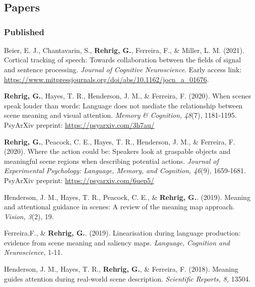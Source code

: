 \section*{}
\label{sec:pubs}

\subsection*{Papers}

\subsubsection*{Published}

Beier, E. J., Chantavarin, S., \textbf{Rehrig, G.}, Ferreira, F., \& Miller, L. M. (2021). Cortical tracking of speech: Towards collaboration between the fields of signal and sentence processing. \textit{Journal of Cognitive Neuroscience}. Early access link: \url{https://www.mitpressjournals.org/doi/abs/10.1162/jocn_a_01676}.

\textbf{Rehrig, G.}, Hayes, T. R., Henderson, J. M., \& Ferreira, F. (2020). When scenes speak louder than words: Language does not mediate the relationship between scene meaning and visual attention. \textit{Memory \& Cognition, 48}(7), 1181-1195. PsyArXiv preprint: \url{https://psyarxiv.com/3h7au/}

\textbf{Rehrig, G.}, Peacock, C. E., Hayes, T. R., Henderson, J. M., \& Ferreira, F. (2020). Where the action could be: Speakers look at graspable objects and meaningful scene regions when describing potential actions. \textit{Journal of Experimental Psychology: Language, Memory, and Cognition, 46}(9), 1659-1681. PsyArXiv preprint: \url{https://psyarxiv.com/6uep5/}

Henderson, J. M., Hayes, T. R., Peacock, C. E., \& \textbf{Rehrig, G.}. (2019). Meaning and attentional guidance in scenes: A review of the meaning map approach. \textit{Vision, 3}(2), 19.


Ferreira,F., \& \textbf{Rehrig, G.}. (2019). Linearisation during language production: evidence from scene meaning and saliency maps. \textit{Language, Cognition and Neuroscience,} 1-11.


Henderson, J. M., Hayes, T. R., \textbf{Rehrig, G.}, \& Ferreira, F. (2018). Meaning guides attention during real-world scene description. \textit{Scientific Reports, 8,} 13504. 


